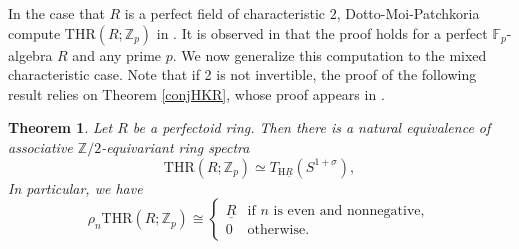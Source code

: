 \documentclass[10pt]{amsart}
\newtheorem{thm}{Theorem}[section]
\theoremstyle{definition}
\numberwithin{equation}{section}
\newcommand{\F}{\mathbb{F}}
\newcommand{\Z}{\mathbb{Z}}
\newcommand{\rH}{\mathrm{H}}
\newcommand{\ul}{\underline}
\newcommand{\THR}{\mathrm{THR}}
\begin{document}
In the case that $R$ is a perfect field of characteristic $2$, Dotto-Moi-Patchkoria compute $\THR(R;\Z_p)$ in \cite[Remark 5.15]{DMP}.
It is observed in \cite[Proposition 6.26]{QS22} that the proof holds for a perfect $\F_p$-algebra $R$ and any prime $p$.
We now generalize this computation to the mixed characteristic
case.
Note that if 2 is not invertible, the proof of the following result relies on Theorem \ref{conjHKR},
whose proof appears in \cite[Theorem 6.20]{Par23}.

\begin{thm}
\label{perfectoid THR}
Let $R$ be a perfectoid ring.
Then there is a natural equivalence of 
associative $\Z/2$-equivariant ring spectra
\[
\THR(R;\Z_p)
\simeq
T_{\rH \ul{R}} (S^{1+\sigma}),
\]
In particular,
we have
\[
\rho_n \THR(R;\Z_p)
\cong
\left\{
\begin{array}{ll}
\ul{R}  & \text{if $n$ is even and nonnegative},
\\
0 & \text{otherwise}.
\end{array}
\right.
\]
\end{thm}
\end{document}
